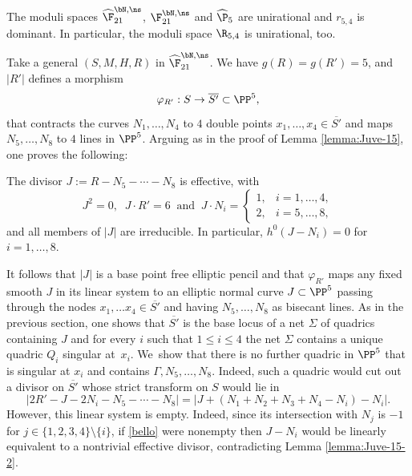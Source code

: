 \begin{thm}\label{54}
The moduli spaces $\widehat{\F}_{21}^{\bN,\ns}$, $\F_{21}^{\bN,\ns}$ and $\widehat\P_{5}$ are unirational and $r_{5,4}$ is dominant. In particular, the moduli space $\R_{5,4}$ is unirational, too.
\end{thm}

Take a general $(S,M,H,R)$ in $\widehat{\F}_{21}^{\bN,\ns}$.
We have $g(R)=g(R')=5$, and $|R'|$ defines a morphism\vspace*{-3pt}
\[
\varphi_{R'}:S\to \overline{S'}\subset \PP^5,
\]
that contracts the curves $N_1,\ldots,N_4$ to $4$ double points $x_1,\ldots,x_4\in \overline{S'}$ and maps $N_5,\ldots,N_8$ to $4$ lines in $\PP^5$.
Arguing as in the proof of Lemma \ref{lemma:Juve-15}, one proves the following:

\begin{lemma} \label{lemma:Juve-15-2}
The divisor
$J:=R-N_5-\cdots-N_8$
is effective, with\vspace*{-3pt}
\[
 J^2=0, \;\; J\cdot R'=6\;\; \mbox{and} \;\; J \cdot N_i =
\begin{cases}
1, & i=1,\ldots,4, \\
2, & i=5,\ldots,8,
\end{cases}
\]
and all members of $|J|$ are irreducible. In particular, $h^0(J-N_i)=0$ for $i=1,\ldots,8$. 
\end{lemma}

It follows that $|J|$ is a base point free elliptic pencil and that
$\varphi_{R'}$ maps any fixed smooth $J$ in its linear system
to an elliptic normal curve $J\subset \PP^5$ passing through the nodes $x_1,\ldots x_4\in \overline{S'}$ and having $N_5,\ldots,N_8$ as bisecant lines. As in the previous section, one shows that $\overline{S'}$ is the base locus of a net $\Sigma$ of quadrics containing $J$ and for every $i$ such that $1\leq i\leq 4$ the net $\Sigma$ contains a unique quadric $Q_i$ singular at~$x_i$. We~show that there is no further quadric in $\PP^5$ that is singular at $x_i$ and contains $\Gamma,N_5,\ldots,N_8$. Indeed, such a quadric would cut out a divisor on $\overline{S'}$ whose strict transform on $S$ would lie in
\begin{equation}\label{bello} |2R'-J-2N_i-N_5-\cdots -N_8|=|J+(N_1+N_2+N_3+N_4-N_i)-N_i |.
\end{equation}
However, this linear system is empty. Indeed, since its intersection with $N_j$ is $-1$ for $j \in \{1,2,3,4\} \setminus \{i\}$, if \eqref{bello} were nonempty then
$J-N_i$ would be linearly equivalent to a nontrivial effective divisor, contradicting Lemma \ref{lemma:Juve-15-2}.

